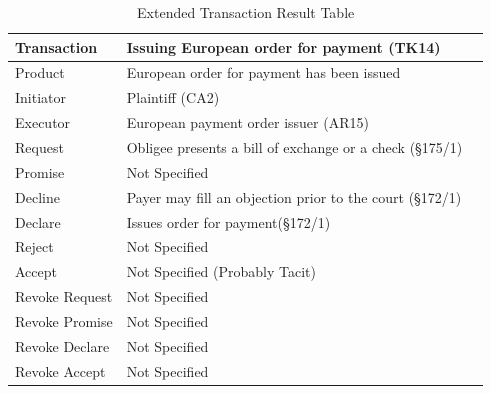 \begin{landscape}
\begin{table}[h]
\caption{Extended Transaction Result Table}
\label{tab:etrt}
\begin{tabular}{|l||l|l|}
\hline
Transaction  &  Issuing European order for payment (TK14) \\ \hline
Product      &  European order for payment has been issued \\ \hline
Initiator      &  Plaintiff (CA2) \\ \hline
Executor       & European payment order issuer (AR15) \\ \hline
Request        &    Obligee presents a bill of exchange or a check (\S175/1)
  \\ \hline
Promise        &    Not Specified   \\ \hline
Decline        &  Payer may fill an objection prior to the court (\S172/1)  \\ \hline
Declare        &  Issues order for payment(\S172/1)  \\ \hline
Reject         &  Not Specified   \\ \hline
Accept         & Not Specified (Probably Tacit) \\ \hline
Revoke Request & Not Specified    \\ \hline
Revoke Promise & Not Specified  \\ \hline
Revoke Declare & Not Specified      \\ \hline
Revoke Accept  &  Not Specified \\ \hline
\end{tabular}
\end{table}


\end{landscape}
